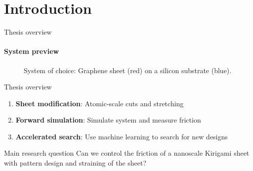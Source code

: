 \documentclass[
	10pt, %
]{beamer}
\begin{document}
\section{Introduction} %
\begin{frame}{Thesis overview}
	\framesubtitle{System preview}
	\begin{figure}
		\centering    
		\caption{System of choice: Graphene sheet (red) on a silicon substrate (blue).}
	\end{figure} 
\end{frame}
%
%
\begin{frame}{Thesis overview}
	\begin{enumerate}
		\setlength\itemsep{1em}
		\item \textbf{Sheet modification}: Atomic-scale cuts and stretching
		\item \textbf{Forward simulation}: Simulate system and measure friction
		\item \textbf{Accelerated search}: Use machine learning to search for new designs
	\end{enumerate}
	\vspace{2mm}
	\begin{center}
		\begin{minipage}{0.7\textwidth}
			\begin{block}{Main research question}
				Can we control the friction of a nanoscale Kirigami sheet with pattern design and straining of the sheet?
			\end{block}	
		\end{minipage}
	\end{center}

\end{frame}
%
%
\end{document}
